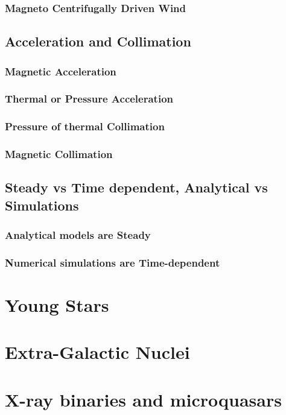 \documentclass[10pt,a4paper,english,draft]{article}
\begin{document}
\subsubsection{Magneto Centrifugally Driven Wind}
\subsection{Acceleration and Collimation}
\subsubsection{Magnetic Acceleration}
\subsubsection{Thermal or Pressure Acceleration}
\subsubsection{Pressure of thermal Collimation}
\subsubsection{Magnetic Collimation}
\subsection{Steady vs Time dependent, Analytical vs Simulations}
\subsubsection{Analytical models are Steady}
\subsubsection{Numerical simulations are Time-dependent}

\section{Young Stars}
\section{Extra-Galactic Nuclei}
\section{X-ray binaries and microquasars}

\appendix

\makeatletter
\def\@seccntformat#1{Appendix~\csname the#1\endcsname:\quad}
\makeatother

\newpage




\listoffixmes
\end{document}
